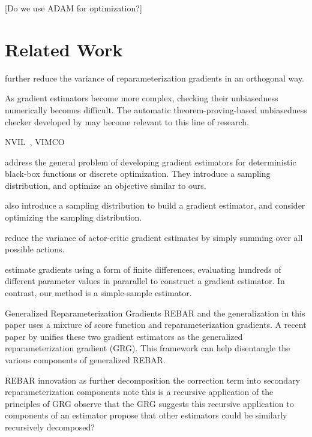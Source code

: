 \documentclass{article}
\begin{document}
\citet{mnih-dqn-2015}

[Do we use ADAM \citep{kingma2015adam} for optimization?]





\section{Related Work}
\label{related work}

\citet{miller2017reducing} further reduce the variance of reparameterization gradients in an orthogonal way.

As gradient estimators become more complex, checking their unbiasedness numerically becomes difficult.
The automatic theorem-proving-based unbiasedness checker developed by \citet{selsam2017developing} may become relevant to this line of research.

NVIL~\citep{mnih2014neural}, VIMCO~\citep{mnih2016variational}

\citet{staines2012variational} address the general problem of developing gradient estimators for deterministic black-box functions or discrete optimization.
They introduce a sampling distribution, and optimize an objective similar to ours. 

\citet{wierstra2014natural} also introduce a sampling distribution to build a gradient estimator, and consider optimizing the sampling distribution.

\citet{asadi2017mean} reduce the variance of actor-critic gradient estimates by simply summing over all possible actions.

\citet{salimans2017evolution} estimate gradients using a form of finite differences, evaluating hundreds of different parameter values in pararallel to construct a gradient estimator.
In contrast, our method is a simple-sample estimator.

\par{Generalized Reparameterization Gradients}
REBAR and the generalization in this paper uses a mixture of score function and reparameterization gradients.
A recent paper by \cite{ruiz2016generalized} unifies these two gradient estimators as the generalized reparameterization gradient (GRG).
This framework can help disentangle the various components of generalized REBAR.

REBAR innovation as further decomposition the correction term into secondary reparameterization components
note this is a recursive application of the principles of GRG
observe that the GRG suggests this recursive application to components of an estimator
propose that other estimators could be similarly recursively decomposed?
\end{document}
